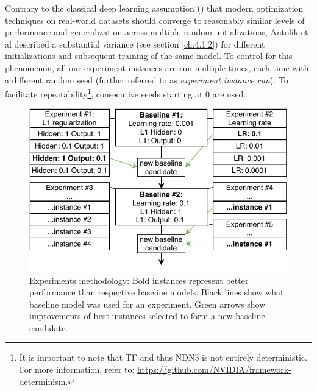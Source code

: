 Contrary to the classical deep learning assumption (\cite{2017arXiv170610239W}) that modern optimization techniques on real-world datasets should converge to reasonably similar levels of performance and generalization across multiple random initializations, Antolik et al described a substantial variance (see section \ref{ch:4.1.2}) for different initializations and subsequent training of the same model. To control for this phenomenon, all our experiment instances are run multiple times, each time with a different random seed (further referred to as \textit{experiment instance run}). To facilitate repeatability\footnote{It is important to note that TF and thus NDN3 is not entirely deterministic. For more information, refer to: \href{https://github.com/NVIDIA/framework-determinism}{https://github.com/NVIDIA/framework-determinism}.}, consecutive seeds starting at 0 are used.

\begin{figure}[ht]
    \centering
    \includegraphics[]{../figures/04_explor_1}
    \caption[Experiments methodology]{Experiments methodology: Bold instances represent better performance than respective baseline models. Black lines show what baseline model was used for an experiment. Green arrows show improvements of best instances selected to form a new baseline candidate.}
    \label{fig:4.1}
\end{figure}

